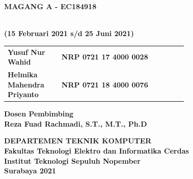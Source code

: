 \begin{flushleft}

  \sffamily\color{white}

  \noindent\textbf{MAGANG A - EC184918}
  \vspace{4ex}

   \\
  \textbf{(15 Februari 2021 s/d 25 Juni 2021)}
  \vspace{6ex}

  \vspace{6ex}

  \begin{adjustwidth}{-2mm}{}
    \begin{tabular}{lcp{0.7\linewidth}}
      \textbf{Yusuf Nur Wahid} & & \textbf{NRP 0721 17 4000 0028} \\
      \textbf{Helmika Mahendra Priyanto} & & \textbf{NRP 0721 18 4000 0076} \\
    \end{tabular}
  \end{adjustwidth}
  \vspace{4ex}

  \noindent\textbf{Dosen Pembimbing} \\
  \textbf{Reza Fuad Rachmadi, S.T., M.T., Ph.D}
  \vspace{10ex}

  \noindent\textbf{DEPARTEMEN TEKNIK KOMPUTER} \\
  \textbf{Fakultas Teknologi Elektro dan Informatika Cerdas} \\
  \textbf{Institut Teknologi Sepuluh Nopember} \\
  \textbf{Surabaya 2021}

\end{flushleft}

\restoregeometry